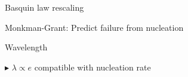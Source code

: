 \documentclass[xcolor=table]{beamer}
\begin{document}
\appendix
{}
\setcounter{finalframe}{\value{framenumber}}

\begin{frame}{Basquin law rescaling}
	
\end{frame}

\begin{frame}{Monkman-Grant: Predict failure from nucleation}
	
\end{frame}

\begin{frame}{Wavelength}
	
	\textcolor{Accent1}{$\blacktriangleright$} $\lambda\propto e$ compatible with nucleation rate

\end{frame}
\end{document}

